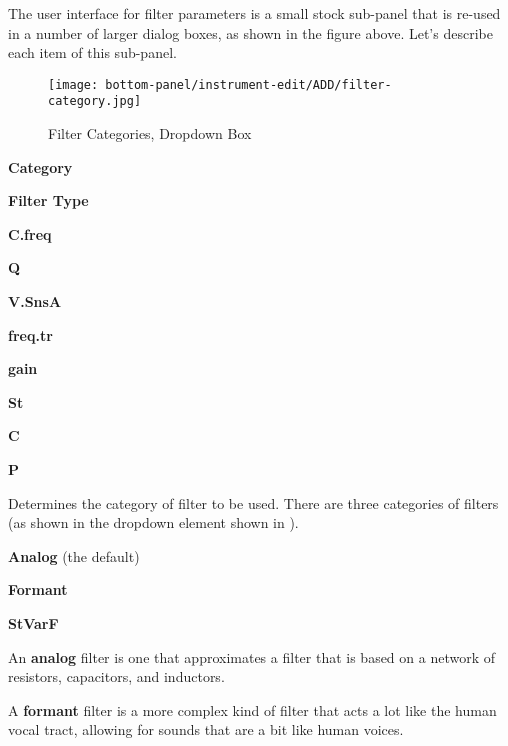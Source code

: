    The user interface for filter parameters is a small stock sub-panel that
   is re-used in a number of larger dialog boxes, as shown in the figure
   above.  Let's describe each item of this sub-panel.


\begin{figure}[H]
   \centering 
   \texttt{[image: bottom-panel/instrument-edit/ADD/filter-category.jpg]}
   \caption[Filter Categories Dropdown]{Filter Categories, Dropdown Box}
   \label{fig:filter_categories_dropdown} 
\end{figure}

   \begin{enumber}
      \item \textbf{Category}
      \item \textbf{Filter Type}
      \item \textbf{C.freq}
      \item \textbf{Q}
      \item \textbf{V.SnsA}
      \item \textbf{freq.tr}
      \item \textbf{gain}
      \item \textbf{St}
      \item \textbf{C}
      \item \textbf{P}
   \end{enumber}

   \setcounter{ItemCounter}{0}      %

   Determines the category of filter to be used.
   There are three categories of filters
   (as shown in the dropdown element shown in
   ).

\begin{enumber}                     %
   \item \textbf{Analog} (the default)
   \item \textbf{Formant}
   \item \textbf{StVarF}
\end{enumber}

   An \textbf{analog} filter
   is one that approximates a filter that is based on
   a network of resistors, capacitors, and inductors.

   A \textbf{formant} filter
   is a more complex kind of filter that acts a lot
   like the human vocal tract, allowing for sounds that
   are a bit like human voices.


